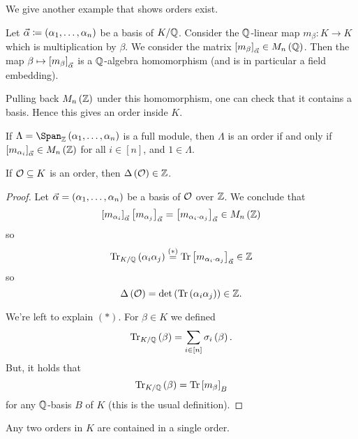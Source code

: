 \documentclass[11pt]{karticle}
\begin{document}
We give another example that shows orders exist.

\begin{example}
Let $\vec{\alpha} \coloneqq \left( \alpha_1, \ldots, \alpha_n \right)$ be a basis of $K/\mathbb{Q}$. Consider the $\mathbb{Q}$-linear map $m_\beta \colon K \to K$ which is multiplication by $\beta$. We consider the matrix $\left[ m_\beta \right]_{\vec{\alpha}} \in M_n\left( \mathbb{Q} \right)$. Then the map $\beta \mapsto \left[ m_{\beta} \right]_{\vec{\alpha}}$ is a $\mathbb{Q}$-algebra homomorphism (and is in particular a field embedding).

Pulling back $M_n\left( \mathbb{Z} \right)$ under this homomorphism, one can check that it contains a basis. Hence this gives an order inside $K$. 
\end{example}

\begin{remark}
If $\Lambda = \Span_{\mbb{Z}}\prs{\alpha_1, \ldots, \alpha_n}$ is a full module, then $\Lambda$ is an order if and only if $\left[ m_{\alpha_i} \right]_{\vec{\alpha}} \in M_n\left( \mathbb{Z} \right)$ for all $i \in [n]$, and $1 \in \Lambda$.
\end{remark}

\begin{proposition}
If $\mathcal{O} \subseteq K$ is an order, then $\Delta\left( \mathcal{O} \right) \in \mathbb{Z}$.
\end{proposition}

\begin{proof}
Let $\vec{\alpha} = \left( \alpha_1, \ldots, \alpha_n \right)$ be a basis of $\mathcal{O}$ over $\mathbb{Z}$. 
We conclude that
\[\left[ m_{\alpha_i} \right]_{\vec{\alpha}} \left[ m_{\alpha_j} \right]_{\vec{\alpha}} = \left[ m_{\alpha_i \cdot \alpha_j} \right]_{\vec{\alpha}} \in M_n\left( \mathbb{Z} \right)\]
so
\[\mathrm{Tr}_{K/\mathbb{Q}}\left( \alpha_i \alpha_j \right) \stackrel{(*)}{=} \mathrm{Tr}\left[ m_{\alpha_i \cdot \alpha_j} \right]_{\vec{\alpha}} \in \mathbb{Z}\]
so
\[\Delta\left( \mathcal{O} \right) = \det\left( \mathrm{Tr}\left( \alpha_i \alpha_j \right) \right) \in \mathbb{Z} \text{.}\]

We're left to explain $(*)$. For $\beta \in K$ we defined
\[\mathrm{Tr}_{K/\mathbb{Q}}\left( \beta \right) = \sum_{i \in [n]} \sigma_i\left( \beta \right) \text{.}\]
But, it holds that
\[\mathrm{Tr}_{K/\mathbb{Q}}\left( \beta \right) = \mathrm{Tr}\left[ m_{\beta} \right]_{B}\]
for any $\mathbb{Q}$-basis $B$ of $K$ (this is the usual definition).
\end{proof}

\begin{proposition}
Any two orders in $K$ are contained in a single order.
\end{proposition}
\end{document}
